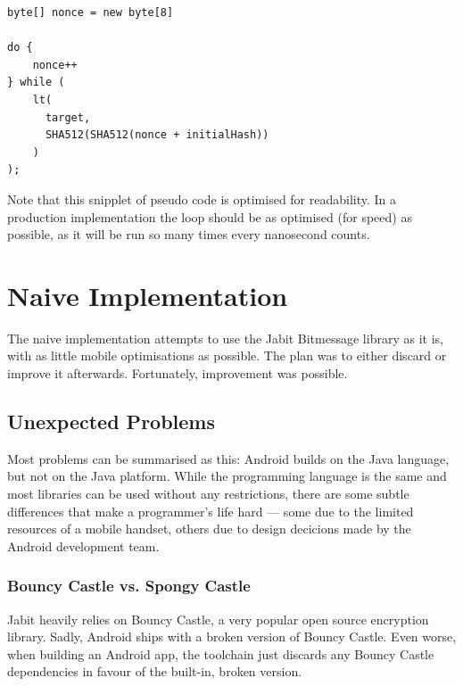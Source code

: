 \documentclass{bfh}
\begin{document}
\begin{lstlisting}
byte[] nonce = new byte[8]

do {
    nonce++
} while (
    lt(
      target,
      SHA512(SHA512(nonce + initialHash))
    )
);
\end{lstlisting}


  Note that this snipplet of pseudo code is optimised for readability. In a production implementation the loop should be as optimised (for speed) as possible, as it will be run so many times every nanosecond counts.


  \newpage
  \section{Naive Implementation}
  
  The naive implementation attempts to use the Jabit Bitmessage library as it is, with as little mobile optimisations as possible. The plan was to either discard or improve it afterwards. Fortunately, improvement was possible.

  \subsection{Unexpected Problems}
  Most problems can be summarised as this: Android builds on the Java language, but not on the Java platform. While the programming language is the same and most libraries can be used without any restrictions, there are some subtle differences that make a programmer's life hard --- some due to the limited resources of a mobile handset, others due to design decicions made by the Android development team.
  
  \subsubsection{Bouncy Castle vs. Spongy Castle}
  \label{subsec:bcvssc}
  Jabit heavily relies on Bouncy Castle, a very popular open source encryption library.\cite{bouncy} Sadly, Android ships with a broken version of Bouncy Castle. Even worse, when building an Android app, the toolchain just discards any Bouncy Castle dependencies in favour of the built-in, broken version.
\end{document}
